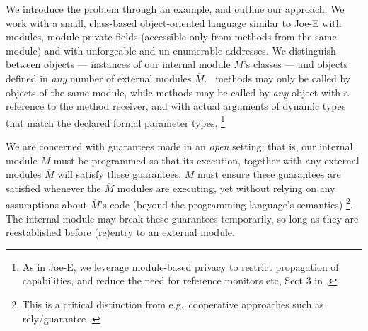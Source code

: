 \newcommand{\pwd}{key}

\renewcommand{\password}{key\xspace}

We introduce the problem  through an example, and outline our
approach.  We work with a  small, class-based object-oriented language similar to Joe-E \cite{JoeE} with modules,   module-private fields
({accessible} only from   methods {from} the same module)
and with unforgeable and un-enumerable addresses.
We distinguish between  \emph{\internalO}
objects --- instances of our internal module $M$'s classes ---
and \emph{\externalO} objects defined in
\emph{any} number of external modules $\overline M$.~ 
{ methods  {may only be} called by objects of the same
  module,  while   methods  may be called by \emph{any}
  object with a reference to the method receiver, {and with
  actual arguments of  dynamic types that match} the declared formal parameter types.} 
\footnote{As in Joe-E, we leverage  module-based privacy to restrict propagation of capabilities, and reduce the need for reference monitors etc, \cf Sect 3 in  \cite{JoeE}.}   

 \label{s:concepts}

We are concerned with guarantees made in an \emph{open} setting; that
is, our internal module
$M$ must be programmed so that 
its execution, together with any external modules $\overline M$
will satisfy these guarantees.
$M$ must ensure these guarantees are satisfied
whenever the
$\overline M$  \emph{\externalM} modules are executing,
yet without relying on any assumptions about $\overline M$'s code
(beyond the programming language's semantics)%
\footnote{
This is a critical distinction from e.g.\
cooperative approaches such as rely/guarantee
\cite{relyGuarantee-HayesJones-setss2017,relyGuarantee-vanStaden-mpc2015}.}.
The internal module may break these guarantees temporarily,
so long as they {are reestablished} before (re)entry to an external module.
 

 
